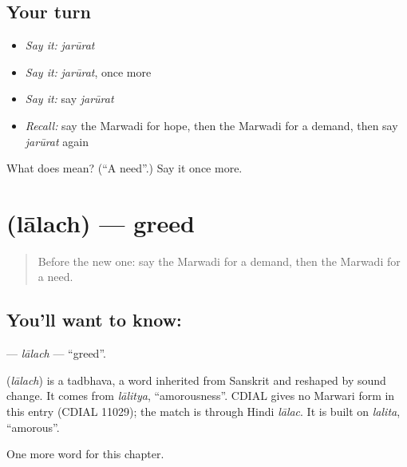 \subsection*{Your turn}
\begin{itemize}
\raggedright
  \item \emph{Say it:} \emph{jarūrat}
  \item \emph{Say it:} \emph{jarūrat}, once more
  \item \emph{Say it:} say \emph{jarūrat}
  \item \emph{Recall:} say the Marwadi for hope, then the Marwadi for a demand, then say \emph{jarūrat} again
\end{itemize}

\begin{tcolorbox}[breakable,colback=teal!4,colframe=teal!35!black,title={Before you move on}]
What does  mean? (\textquotedblleft{}A need\textquotedblright{}.) Say it once more.
\end{tcolorbox}
\section[\texorpdfstring{\mw{लालच} (lālach)}{लालच (lālach)}]{ (lālach) — greed}

\label{lesson:MW-C112-lalach}



\begin{quote}
Before the new one: say the Marwadi for a demand, then the Marwadi for a need.
\end{quote}

\subsection*{You'll want to know: }
\textbf{} — \emph{lālach} — \textquotedblleft{}greed\textquotedblright{}.

\begin{cousinweb}
\textbf{} (\emph{lālach}) is a tadbhava, a word inherited from Sanskrit and reshaped by sound change. It comes from \emph{lālitya}, \textquotedblleft{}amorousness\textquotedblright{}. CDIAL gives no Marwari form in this entry (CDIAL 11029); the match is through Hindi \emph{lālac}. It is built on \emph{lalita}, \textquotedblleft{}amorous\textquotedblright{}.
\end{cousinweb}

\begin{grammarlens}[title={What you've built}]
One more word for this chapter.
\end{grammarlens}

